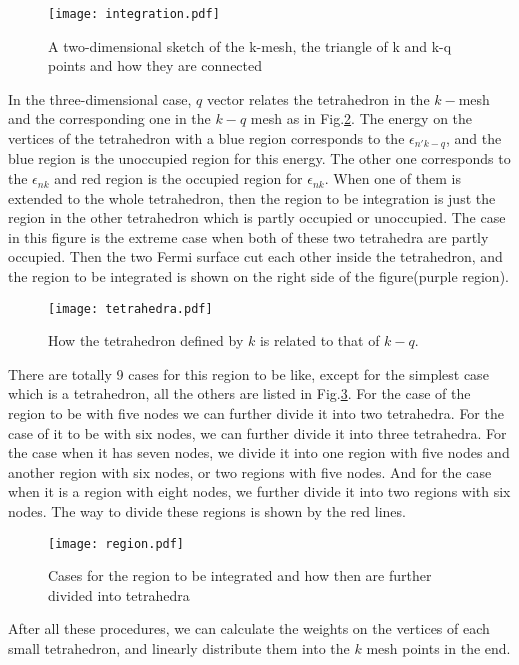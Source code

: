 \documentclass[10pt]{article}
\begin{document}
\begin{figure}[h]
\texttt{[image: integration.pdf]}
\caption{A two-dimensional sketch of the k-mesh, the triangle of k and k-q points and how they are connected} \label{integration}
\end{figure}

In the three-dimensional case, $q$ vector relates the tetrahedron in the $k-$mesh and the corresponding one in the $k-q$ mesh as in Fig.\ref{tetrahedra}. The energy on the vertices of the tetrahedron with a blue region corresponds to the $\epsilon_{n'k-q}$, and the blue region is the unoccupied region for this energy. The other one corresponds to the $\epsilon_{nk}$ and red region is the occupied region for $\epsilon_{nk}$. When one of them is extended to the whole tetrahedron, then the region to be integration is just the region in the other tetrahedron which is partly occupied or unoccupied. The case in this figure is the extreme case when both of these two tetrahedra are partly occupied. Then the two Fermi surface cut each other inside the tetrahedron, and the region to be integrated is shown on the right side of the figure(purple region). \\

\begin{figure}[h]
\texttt{[image: tetrahedra.pdf]}
\caption{How the tetrahedron defined by $k$ is related to that of $k-q$.} 
\label{tetrahedra}
\end{figure}

There are totally 9 cases for this region to be like, except for the simplest case which is a tetrahedron, all the others are listed in Fig.\ref{region}. For the case of the region to be with five nodes we can further divide it into two tetrahedra. For the case of it to be with six nodes, we can further divide it into three tetrahedra. For the case when it has seven nodes, we divide it into one region with five nodes and another region with six nodes, or two regions with five nodes. And for the case when it is a region with eight nodes, we further divide it into two regions with six nodes. The way to divide these regions is shown by the red lines.   

\begin{figure}[h]
\texttt{[image: region.pdf]}
\caption{Cases for the region to be integrated and how then are further divided into tetrahedra} 
\label{region}
\end{figure}

After all these procedures, we can calculate the weights on the vertices of each small tetrahedron, and linearly distribute them into the $k$ mesh points in the end.  \\
\end{document}
